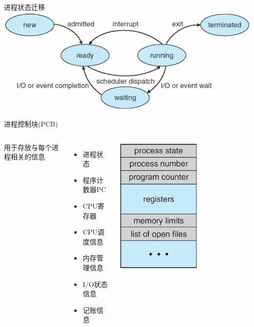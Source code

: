\documentclass[xcolor=svgnames]{beamer}
\begin{document}
\begin{CJK*}{UTF8}{gbsn}
\begin{frame}{进程状态迁移}
\includegraphics[width=1.0\textwidth]{state.png}
\end{frame}

\begin{frame}{进程控制块(PCB)}
\begin{columns}%
用于存放与每个进程相关的信息
\begin{itemize}
\item 进程状态
\item 程序计数器PC
\item CPU寄存器
\item CPU调度信息
\item 内存管理信息
\item I/O状态信息
\item 记账信息
\end{itemize}
\includegraphics[width=0.6\textwidth]{PCB.png}
\end{columns}%
\end{frame}


\end{CJK*}
\end{document}
